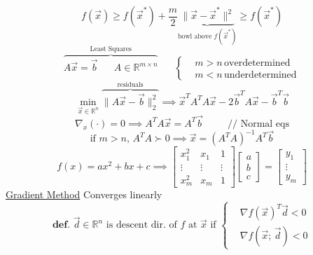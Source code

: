 \documentclass[twocolumn,12pt]{article}    %
\begin{document}
\begin{equation*}
    f(\vec{x}) \geq f(\vec{x}^*) + \frac{m}{2} \underbrace{ \|\vec{x} - \vec{x}^*\|^2}_{\text{bowl above } f(\vec{x}^*)} \geq f(\vec{x}^*)
\end{equation*}\vspace{-10pt}
\begin{equation*}
    \overbrace{A\vec{x} = \vec{b} \hspace{20pt} A\in\mathds{R}^{m\times n } }^{\text{Least Squares}} \hspace{20pt} \begin{cases}
        &m>n\, \text{overdetermined } \\
        &m<n \, \text{underdetermined} 
    \end{cases}
\end{equation*}\vspace{-10pt}
\begin{equation*}
    \min_{\vec{x} \in \mathds{R}^n} \overbrace{\|A\vec{x} - \vec{b}\|_2^2}^{\text{residuals}} \implies \vec{x}^TA^T A\vec{x} - 2\vec{b}^TA\vec{x} - \vec{b}^T\vec{b}
\end{equation*}
\begin{equation*}
    \nabla_x(\cdot) =0 \implies A^TA \vec{x} = A^T\vec{b} \hspace{30pt} \text{// Normal eqs}
\end{equation*}
\begin{equation*}
    \text{if } m>n,\, A^TA \succ 0 \implies \vec{x} = (A^TA)^{-1} A^T \vec{b}
\end{equation*}
\begin{equation*}
    f(x) = ax^2 +bx +c\implies \begin{bmatrix}
        x_1^2 & x_1 & 1 \\
        \vdots & \vdots & \vdots \\
        x_m^2 & x_m & 1
    \end{bmatrix} \begin{bmatrix}
        a\\b\\c
    \end{bmatrix} = \begin{bmatrix}
        y_1 \\ \vdots \\ y_m
    \end{bmatrix}
\end{equation*}
\noindent\underline{Gradient Method} \hspace{100pt} Converges linearly
\begin{equation*}
    \textbf{def. } \vec{d} \in \mathds{R}^n \text{ is descent dir. of } f \text{ at } \vec{x} \text{ if } \begin{cases}
        &\nabla f(\vec{x})^T\vec{d} <0\\
        & \nabla f(\vec{x};\,\vec{d}) <0
    \end{cases}
\end{equation*}
\end{document}
